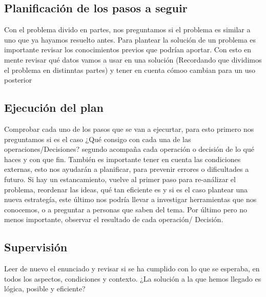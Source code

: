 \documentclass{article}
\begin{document}
\subsection{Planificación de los pasos a seguir}
Con el problema divido en partes, nos preguntamos si el problema es similar a uno que ya hayamos resuelto antes. Para plantear la solución de un problema es importante revisar los conocimientos previos que podrían aportar. Con esto en mente revisar qué datos vamos a usar en una solución (Recordando que dividimos el problema en distinntas partes) y tener en cuenta cómoo cambian para un uso posterior
\subsection{Ejecución del plan}
Comprobar cada uno de los pasos que se van a ejecurtar, para esto primero nos preguntamos si es el caso ¿Qué consigo con cada una de las operaciones/Decisiones? segundo acompaña cada operación o decisión de lo qué haces y con que fin. También es importante tener en cuenta las condiciones externas, esto nos ayudarán a planificar, para prevenir errores o dificultades a futuro. Si hay un  estancamiento, vuelve al primer paso para re-análizar el problema, reordenar las ideas, qué tan eficiente es y si es el caso plantear una nueva estrategía, este último nos podría llevar a investigar herramientas que nos conocemos, o a preguntar a personas que saben del tema.
Por último pero no menos importante, observar el resultado de cada operación/ Decisión.

\subsection{Supervisión}
Leer de nuevo el enunciado y revisar si se ha cumplido con lo que se esperaba, en todos los aspectos, condiciones y contexto. 
¿La solución a la que hemos llegado es lógica, posible y eficiente?



\end{document}
